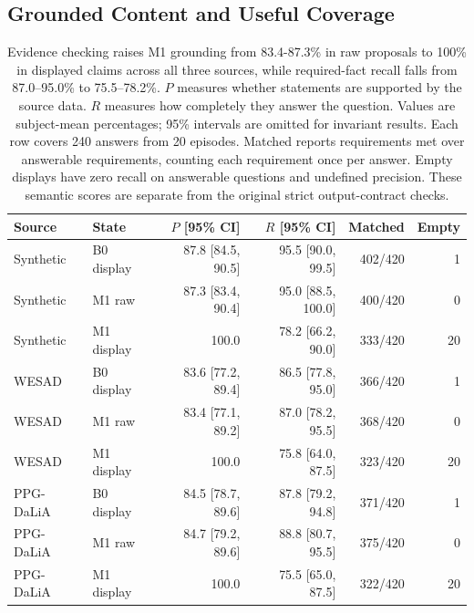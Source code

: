 \documentclass[runningheads]{llncs}
\begin{document}






\subsection{Grounded Content and Useful Coverage}

\begin{table}[!htbp]
\caption{Evidence checking raises M1 grounding from 83.4-87.3\% in raw
proposals to 100\% in displayed claims across all three sources, while
required-fact recall falls from 87.0--95.0\% to 75.5--78.2\%.
$P$ measures whether statements are supported by the source data.
$R$ measures how completely they answer the question.
Values are subject-mean percentages; 95\% intervals are omitted for invariant results.
Each row covers 240 answers from 20 episodes.
Matched reports requirements met over answerable requirements, counting
each requirement once per answer. Empty displays have zero recall on
answerable questions and undefined precision. These semantic scores are
separate from the original strict output-contract checks.}
\label{tab:fidelity}
\centering\scriptsize\setlength{\tabcolsep}{3pt}
\begin{tabular}{llrrrr}
\toprule
Source & State & $P$ [95\% CI] & $R$ [95\% CI] & Matched & Empty \\
\midrule
Synthetic & B0 display & 87.8 [84.5, 90.5] & 95.5 [90.0, 99.5] & 402/420 & 1 \\
Synthetic & M1 raw & 87.3 [83.4, 90.4] & 95.0 [88.5, 100.0] & 400/420 & 0 \\
Synthetic & M1 display & 100.0 & 78.2 [66.2, 90.0] & 333/420 & 20 \\
WESAD & B0 display & 83.6 [77.2, 89.4] & 86.5 [77.8, 95.0] & 366/420 & 1 \\
WESAD & M1 raw & 83.4 [77.1, 89.2] & 87.0 [78.2, 95.5] & 368/420 & 0 \\
WESAD & M1 display & 100.0 & 75.8 [64.0, 87.5] & 323/420 & 20 \\
PPG-DaLiA & B0 display & 84.5 [78.7, 89.6] & 87.8 [79.2, 94.8] & 371/420 & 1 \\
PPG-DaLiA & M1 raw & 84.7 [79.2, 89.6] & 88.8 [80.7, 95.5] & 375/420 & 0 \\
PPG-DaLiA & M1 display & 100.0 & 75.5 [65.0, 87.5] & 322/420 & 20 \\
\bottomrule
\end{tabular}
\space%
 \end{table}
\end{document}
